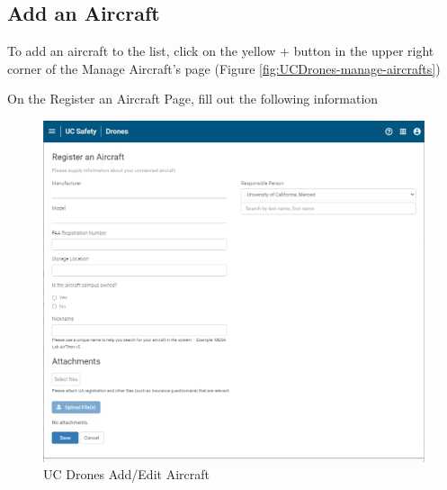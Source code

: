\documentclass[
  12pt,
]{book}
\begin{document}
\subsection{Add an Aircraft}\label{add-an-aircraft}

To add an aircraft to the list, click on the yellow + button in the upper right corner of the Manage Aircraft's page (Figure \ref{fig:UCDrones-manage-aircrafts})

On the Register an Aircraft Page, fill out the following information

\begin{figure}

{\centering \includegraphics[width=0.95\linewidth]{images/UCDrones_aircraft} 

}

\caption{UC Drones Add/Edit Aircraft}\label{fig:UCDrones-edit-aircrafts}
\end{figure}
\end{document}
